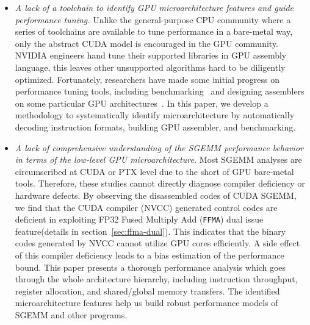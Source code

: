 \begin{itemize}
\item {\em A lack of a toolchain to identify GPU microarchitecture features and guide performance tuning.}
  Unlike the general-purpose CPU community where a series of toolchains are available to tune performance in a bare-metal
  way, only the abstract CUDA model is encouraged in the GPU community. 
  NVIDIA engineers hand tune their supported %
  libraries in GPU assembly language, this leaves other unsupported algorithms hard to be diligently optimized.
  Fortunately, researchers have made some initial progress on performance tuning tools, including benchmarking~\cite{mei, volkov, wong} and designing assemblers on some particular GPU architectures~\cite{asfermi,bernstein2012usable,decuda,maxas}. %
In this paper, we develop a methodology to systematically identify 
microarchitecture by automatically decoding instruction formats, building GPU assembler, and benchmarking.
\item {\em A lack of comprehensive understanding of the SGEMM performance behavior in terms of the low-level GPU microarchitecture.} 
Most SGEMM analyses are circumscribed at CUDA or PTX level due to the short of GPU bare-metal tools. 
Therefore, these studies cannot directly diagnose compiler deficiency or hardware 
defects. 
By observing the disassembled codes of CUDA SGEMM, we find that the CUDA
compiler (NVCC) generated control codes are deficient in exploiting
FP32 Fused Multiply Add ({\tt FFMA}) dual issue feature(details in
section~\ref{sec:ffma-dual}). 
This indicates that the binary codes generated by NVCC cannot utilize GPU cores efficiently. %
A side effect of this compiler deficiency leads to a bias estimation of the performance bound. 
This paper presents a thorough performance analysis which goes through the whole architecture hierarchy, including instruction 
throughput, register allocation, and shared/global memory transfers. 
The identified microarchitecture features help us build robust performance models of SGEMM and other programs.
\end{itemize}


